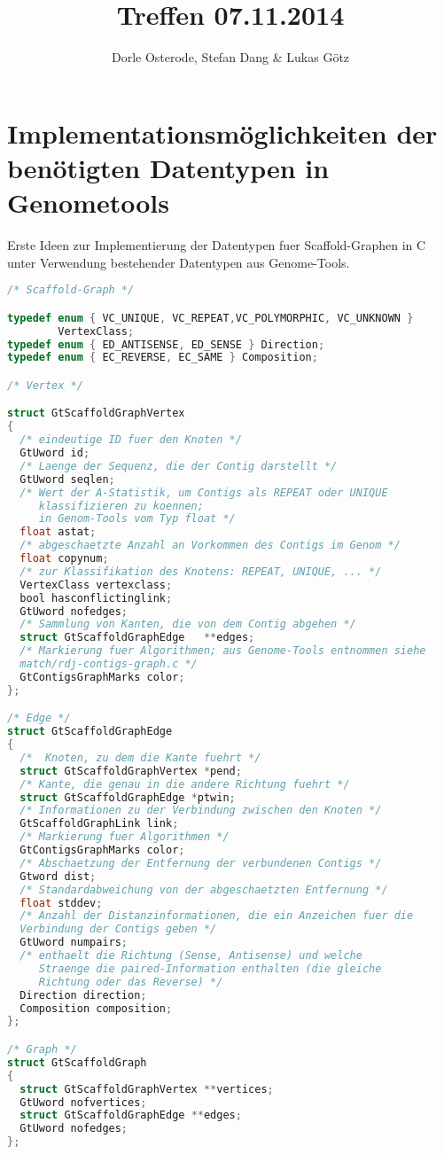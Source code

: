 \documentclass[a4paper,10pt,parskip]{scrartcl}
\title{Treffen 07.11.2014}
\author{Dorle Osterode, Stefan Dang \& Lukas Götz}
\begin{document}
\maketitle{}

\section{Implementationsmöglichkeiten der benötigten Datentypen in Genometools}

Erste Ideen zur Implementierung der Datentypen fuer Scaffold-Graphen in C unter
Verwendung bestehender Datentypen aus Genome-Tools.

\begin{lstlisting}[language=C]
/* Scaffold-Graph */

typedef enum { VC_UNIQUE, VC_REPEAT,VC_POLYMORPHIC, VC_UNKNOWN }
	 	VertexClass;
typedef enum { ED_ANTISENSE, ED_SENSE } Direction;
typedef enum { EC_REVERSE, EC_SAME } Composition;

/* Vertex */

struct GtScaffoldGraphVertex
{
  /* eindeutige ID fuer den Knoten */
  GtUword id;
  /* Laenge der Sequenz, die der Contig darstellt */
  GtUword seqlen; 
  /* Wert der A-Statistik, um Contigs als REPEAT oder UNIQUE
     klassifizieren zu koennen;
     in Genom-Tools vom Typ float */
  float astat;	
  /* abgeschaetzte Anzahl an Vorkommen des Contigs im Genom */
  float copynum;  
  /* zur Klassifikation des Knotens: REPEAT, UNIQUE, ... */
  VertexClass vertexclass; 
  bool hasconflictinglink;
  GtUword nofedges;
  /* Sammlung von Kanten, die von dem Contig abgehen */
  struct GtScaffoldGraphEdge   **edges;  
  /* Markierung fuer Algorithmen; aus Genome-Tools entnommen siehe
  match/rdj-contigs-graph.c */
  GtContigsGraphMarks color; 	  
};

/* Edge */
struct GtScaffoldGraphEdge
{
  /*  Knoten, zu dem die Kante fuehrt */
  struct GtScaffoldGraphVertex *pend; 
  /* Kante, die genau in die andere Richtung fuehrt */
  struct GtScaffoldGraphEdge *ptwin; 
  /* Informationen zu der Verbindung zwischen den Knoten */
  GtScaffoldGraphLink link; 
  /* Markierung fuer Algorithmen */
  GtContigsGraphMarks color; 
  /* Abschaetzung der Entfernung der verbundenen Contigs */
  Gtword dist;
  /* Standardabweichung von der abgeschaetzten Entfernung */
  float stddev;
  /* Anzahl der Distanzinformationen, die ein Anzeichen fuer die
  Verbindung der Contigs geben */
  GtUword numpairs;
  /* enthaelt die Richtung (Sense, Antisense) und welche
     Straenge die paired-Information enthalten (die gleiche
     Richtung oder das Reverse) */
  Direction direction;
  Composition composition;
};

/* Graph */
struct GtScaffoldGraph
{
  struct GtScaffoldGraphVertex **vertices;
  GtUword nofvertices;
  struct GtScaffoldGraphEdge **edges;
  GtUword nofedges;
};
\end{lstlisting}
\end{document}
